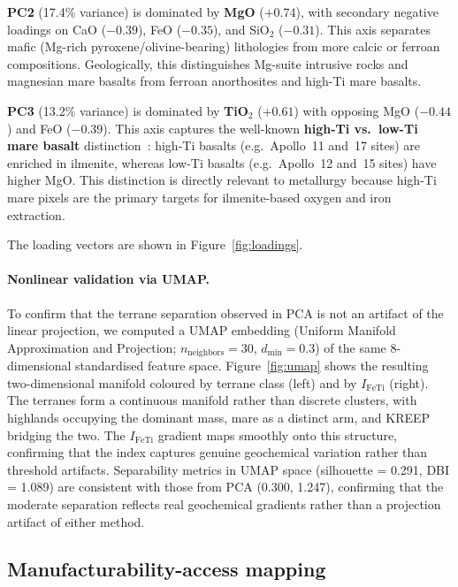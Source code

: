 \documentclass[11pt,a4paper]{article}
\begin{document}
\textbf{PC2} (17.4\% variance) is dominated by \textbf{MgO} ($+0.74$), with secondary negative loadings on CaO ($-0.39$), FeO ($-0.35$), and SiO$_2$ ($-0.31$). This axis separates mafic (Mg-rich pyroxene/olivine-bearing) lithologies from more calcic or ferroan compositions. Geologically, this distinguishes Mg-suite intrusive rocks and magnesian mare basalts from ferroan anorthosites and high-Ti mare basalts.

\textbf{PC3} (13.2\% variance) is dominated by \textbf{TiO$_2$} ($+0.61$) with opposing MgO ($-0.44$) and FeO ($-0.39$). This axis captures the well-known \textbf{high-Ti vs.\ low-Ti mare basalt} distinction~\cite{Lucey2006}: high-Ti basalts (e.g.\ Apollo~11 and~17 sites) are enriched in ilmenite, whereas low-Ti basalts (e.g.\ Apollo~12 and~15 sites) have higher MgO. This distinction is directly relevant to metallurgy because high-Ti mare pixels are the primary targets for ilmenite-based oxygen and iron extraction.

The loading vectors are shown in Figure~\ref{fig:loadings}.

\paragraph{Nonlinear validation via UMAP.}
To confirm that the terrane separation observed in PCA is not an artifact of the linear projection, we computed a UMAP embedding (Uniform Manifold Approximation and Projection; $n_{\text{neighbors}} = 30$, $d_{\min} = 0.3$) of the same 8-dimensional standardised feature space. Figure~\ref{fig:umap} shows the resulting two-dimensional manifold coloured by terrane class (left) and by $I_{\text{FeTi}}$ (right). The terranes form a continuous manifold rather than discrete clusters, with highlands occupying the dominant mass, mare as a distinct arm, and KREEP bridging the two. The $I_{\text{FeTi}}$ gradient maps smoothly onto this structure, confirming that the index captures genuine geochemical variation rather than threshold artifacts. Separability metrics in UMAP space (silhouette = 0.291, DBI = 1.089) are consistent with those from PCA (0.300, 1.247), confirming that the moderate separation reflects real geochemical gradients rather than a projection artifact of either method.

\subsection{Manufacturability-access mapping}
\end{document}
